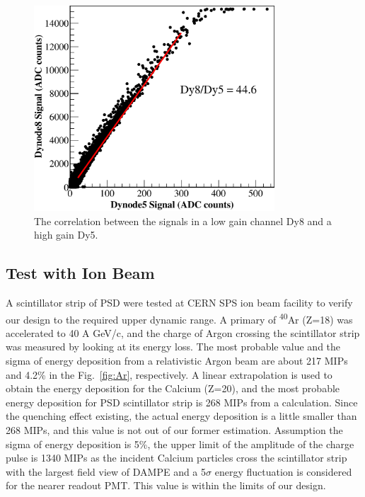 \documentclass[5p, times]{elsarticle}
\begin{document}
\begin{figure}
 \centering
 \includegraphics[width=90mm]{dy58}
\caption{The correlation between the signals in a low gain channel Dy8 and a high gain Dy5.}
\label{fig:dy58}
\end{figure} 

\subsection{Test with Ion Beam}
\label{sec:beam}

A scintillator strip of PSD were tested at CERN SPS ion beam facility to verify our design to the required upper dynamic
range. A primary of \textsuperscript{40}Ar (Z=18) was accelerated to 40 A GeV/c, and the charge of Argon crossing the
scintillator strip was measured by looking at its energy loss. The most probable value and the sigma of energy
deposition from a relativistic Argon beam are about 217 MIPs and 4.2\% in the Fig.~\ref{fig:Ar}, respectively. A linear
extrapolation is used to obtain the energy deposition for the Calcium (Z=20), and the most probable energy deposition
for PSD scintillator strip is 268 MIPs from a calculation. Since the quenching effect existing, the actual energy
deposition is a little smaller than 268 MIPs, and this value is not out of our former estimation. Assumption the sigma
of energy deposition is 5\%, the upper limit of the amplitude of the charge pulse is 1340 MIPs as the incident Calcium
particles cross the scintillator strip with the largest field view of DAMPE and a 5$\sigma $ energy fluctuation is
considered for the nearer readout PMT. This value is within the limits of our design.
\end{document}
